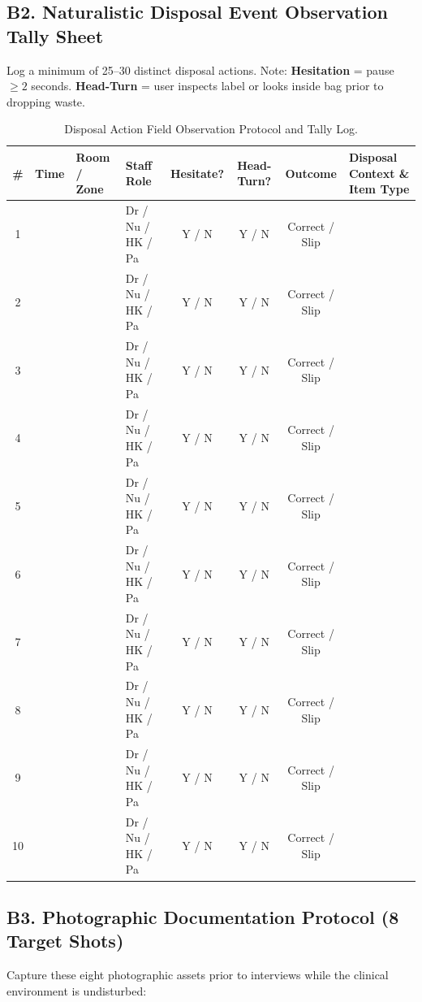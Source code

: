 \documentclass[11pt,a4paper]{article}
\begin{document}
\subsection{B2. Naturalistic Disposal Event Observation Tally Sheet}
Log a minimum of 25--30 distinct disposal actions. Note: \textbf{Hesitation} = pause $\ge 2$ seconds. \textbf{Head-Turn} = user inspects label or looks inside bag prior to dropping waste.

\begin{table}[h!]
\centering
\small
\renewcommand{\arraystretch}{1.2}
\begin{tabularx}{\textwidth}{|c|c|l|l|c|c|c|X|}
\hline
\rowcolor{iitblue}
\color{white}\textbf{\#} & \color{white}\textbf{Time} & \color{white}\textbf{Room / Zone} & \color{white}\textbf{Staff Role} & \color{white}\textbf{Hesitate?} & \color{white}\textbf{Head-Turn?} & \color{white}\textbf{Outcome} & \color{white}\textbf{Disposal Context \& Item Type} \\
\hline
1 & & & Dr / Nu / HK / Pa & Y / N & Y / N & Correct / Slip & \\ \hline
2 & & & Dr / Nu / HK / Pa & Y / N & Y / N & Correct / Slip & \\ \hline
3 & & & Dr / Nu / HK / Pa & Y / N & Y / N & Correct / Slip & \\ \hline
4 & & & Dr / Nu / HK / Pa & Y / N & Y / N & Correct / Slip & \\ \hline
5 & & & Dr / Nu / HK / Pa & Y / N & Y / N & Correct / Slip & \\ \hline
6 & & & Dr / Nu / HK / Pa & Y / N & Y / N & Correct / Slip & \\ \hline
7 & & & Dr / Nu / HK / Pa & Y / N & Y / N & Correct / Slip & \\ \hline
8 & & & Dr / Nu / HK / Pa & Y / N & Y / N & Correct / Slip & \\ \hline
9 & & & Dr / Nu / HK / Pa & Y / N & Y / N & Correct / Slip & \\ \hline
10 & & & Dr / Nu / HK / Pa & Y / N & Y / N & Correct / Slip & \\ \hline
\end{tabularx}
\caption{Disposal Action Field Observation Protocol and Tally Log.}
\end{table}

\subsection{B3. Photographic Documentation Protocol (8 Target Shots)}
Capture these eight photographic assets prior to interviews while the clinical environment is undisturbed:
\end{document}
